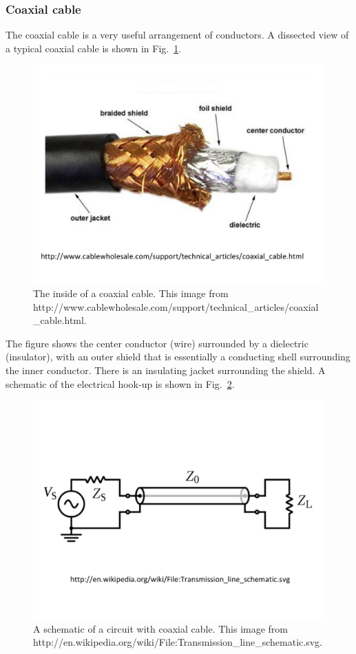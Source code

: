 \documentclass[12pt]{article}
\begin{document}
\begin{flushleft}
\subsubsection*{\bf Coaxial cable}

The coaxial cable is a very useful arrangement of conductors.  A dissected view of a typical coaxial cable is shown in Fig.~\ref{fig:coaxcable}.

\begin{figure}[h]
\centering
\includegraphics*[trim=0cm 1cm 0cm 2cm, clip=true, width=0.6\columnwidth]{coax_dissect.pdf}
\caption{\small The inside of a coaxial cable.  This image from\\ http://www.cablewholesale.com/support/technical\_articles/coaxial\_cable.html.}
\label{fig:coaxcable}
\end{figure}

The figure shows the center conductor (wire) surrounded by a dielectric (insulator), with an outer shield that is essentially a conducting shell surrounding the inner conductor.  There is an insulating jacket surrounding the shield.  A schematic of the electrical hook-up is shown in Fig.~\ref{fig:coaxschematic}. 

\begin{figure}[h]
\centering
\includegraphics*[trim=0cm 2cm 0cm 3cm, clip=true, width=0.6\columnwidth]{coax_schematic.pdf}
\caption{\small A schematic of a circuit with coaxial cable.  This image from\\ 
http://en.wikipedia.org/wiki/File:Transmission\_line\_schematic.svg.}
\label{fig:coaxschematic}
\end{figure}


\end{flushleft}
\end{document}
